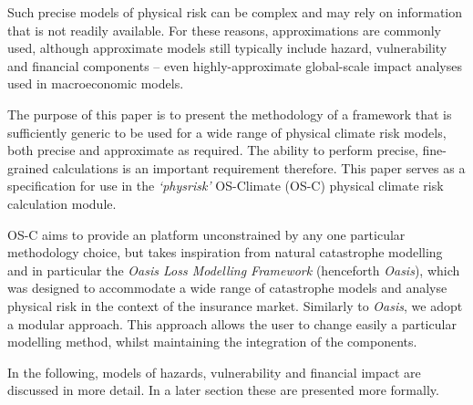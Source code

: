\documentclass[a4paper,11pt]{extarticle} %
\begin{document}
Such precise models of physical risk can be complex and may rely on information that is not readily available. For these reasons, approximations are commonly used, although approximate models still typically include hazard, vulnerability and financial components \cite{BertramEtAl:2020}\cite{WoetzelEtAl:2020} -- even highly-approximate global-scale impact analyses used in macroeconomic models.

The purpose of this paper is to present the methodology of a framework that is sufficiently generic to be used for a wide range of physical climate risk models, both precise and approximate as required. The ability to perform precise, fine-grained calculations is an important requirement therefore. This paper serves as a specification for use in the \emph{`physrisk'} OS-Climate (OS-C) \cite{OSC} physical climate risk calculation module.

OS-C aims to provide an platform unconstrained by any one particular methodology choice, but takes inspiration from natural catastrophe modelling \cite{MitchellEtAl:2017} and in particular the \emph{Oasis Loss Modelling Framework} \cite{OasisLMF} (henceforth \emph{Oasis}), which was designed to accommodate a wide range of catastrophe models and analyse physical risk in the context of the insurance market. Similarly to \emph{Oasis}, we adopt a modular approach. This approach allows the user to change easily a particular modelling method, whilst maintaining the integration of the components. 

In the following, models of hazards, vulnerability and financial impact are discussed in more detail. In a later section these are presented more formally.
\end{document}
